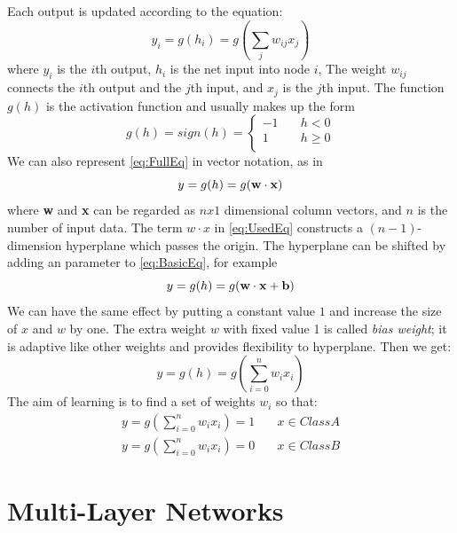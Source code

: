 Each output is updated according to the equation:
\begin{equation}\label{eq:BasicEq}
y_{i} = g(h_{i}) = g\left(\sum_{j}w_{ij}x_{j}\right)
\end{equation}
where $y_{i}$ is the $i$th output, $h_{i}$ is the net input into node $i$, The weight $w_{ij}$ connects the $i$th output and the $j$th input, and $x_{j}$ is the $j$th input. The function $g(h)$ is the activation function and usually makes up the form
\begin{equation}\label{eq:FullEq}
g(h) = sign(h) = 
  \begin{cases}
    -1       & \quad h < 0 \\
    1  & \quad h \geq 0\\
  \end{cases}
\end{equation}
We can also represent \ref{eq:FullEq} in vector notation, as in 
\begin{equation}\label{eq:UsedEq}
y = g(h) = g(\bf w \cdot x)
\end{equation}
where \textbf{w} and \textbf{x} can be regarded as $nx1$ dimensional column vectors, and $n$ is the number of input data.
The term $w \cdot x$ in \ref{eq:UsedEq} constructs a $(n-1)$-dimension hyperplane which passes the origin. The hyperplane can be shifted by adding an parameter to \ref{eq:BasicEq}, for example
\begin{equation}\label{eq:WithBias}
y = g(h) = g(\bf w \cdot x + b)
\end{equation}
We can have the same effect by putting a constant value $1$ and increase the size of $x$ and $w$ by one. The extra weight $w$ with fixed value 1 is called \textit{bias weight}; it is adaptive like other weights and provides flexibility to hyperplane. Then we get:
\begin{equation}\label{eq:finalEq}
y = g(h) = g(\sum_{i=0}^{n}w_{i}x_{i})
\end{equation}
The aim of learning is to find a set of weights $w_{i}$ so that:
\begin{align*}
y = g(\sum_{i=0}^{n}w_{i}x_{i}) = 1  & \quad x \in Class A\\
y = g(\sum_{i=0}^{n}w_{i}x_{i}) = 0  & \quad x \in Class B
\end{align*}


\section{Multi-Layer Networks}

